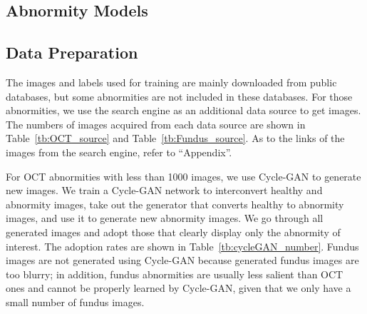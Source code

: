 \documentclass{article}
\begin{document}
	\begin{multicols}{2}
		
	\section{Abnormity Models}
	
	\subsection{Data Preparation}
	
	The images and labels used for training are mainly downloaded from public databases, but some abnormities are not included in these databases. For those abnormities, we use the search engine as an additional data source to get images. The numbers of images acquired from each data source are shown in Table~\ref{tb:OCT_source} and Table~\ref{tb:Fundus_source}. As to the links of the images from the search engine, refer to ``Appendix''. 

	For OCT abnormities with less than 1000 images, we use Cycle-GAN \autocite{Zhu_Park_Isola_Efros_2020} to generate new images. We train a Cycle-GAN network to interconvert healthy and abnormity images, take out the generator that converts healthy to abnormity images, and use it to generate new abnormity images. We go through all generated images and adopt those that clearly display only the abnormity of interest. The adoption rates are shown in Table~\ref{tb:cycleGAN_number}. Fundus images are not generated using Cycle-GAN because generated fundus images are too blurry; in addition, fundus abnormities are usually less salient than OCT ones and cannot be properly learned by Cycle-GAN, given that we only have a small number of fundus images.
	\end{multicols}
	
\end{document}
